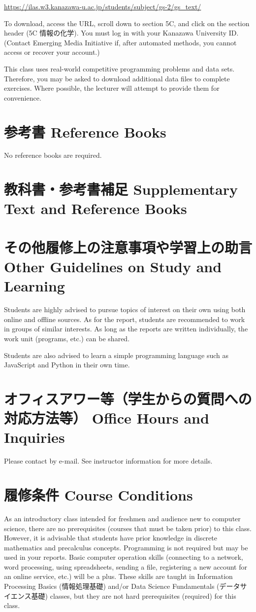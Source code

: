 \documentclass[a4paper]{article}
\begin{document}
\url{https://ilas.w3.kanazawa-u.ac.jp/students/subject/gs-2/gs_text/}

To download, access the URL, scroll down to section 5C, and click on the section header (5C 情報の化学). You must log in with your Kanazawa University ID. (Contact Emerging Media Initiative if, after automated methods, you cannot access or recover your account.)

This class uses real-world competitive programming problems and data sets. Therefore, you may be asked to download additional data files to complete exercises. Where possible, the lecturer will attempt to provide them for convenience.

\section{参考書 Reference Books}
No reference books are required.

\section{教科書・参考書補足 Supplementary Text and Reference Books}

\section{その他履修上の注意事項や学習上の助言 Other Guidelines on Study and Learning}
Students are highly advised to pursue topics of interest on their own using both online and offline sources. As for the report, students are recommended to work in groups of similar interests. As long as the reports are written individually, the work unit (programs, etc.) can be shared.

Students are also advised to learn a simple programming language such as JavaScript and Python in their own time.

\section{オフィスアワー等（学生からの質問への対応方法等） Office Hours and Inquiries}
Please contact by e-mail. See instructor information for more details.

\section{履修条件 Course Conditions}
As an introductory class intended for freshmen and audience new to computer science, there are no prerequisites (courses that must be taken prior) to this class. However, it is advisable that students have prior knowledge in discrete mathematics and precalculus concepts. Programming is not required but may be used in your reports. Basic computer operation skills (connecting to a network, word processing, using spreadsheets, sending a file, registering a new account for an online service, etc.) will be a plus. These skills are taught in Information Processing Basics (情報処理基礎) and/or Data Science Fundamentals (データサイエンス基礎) classes, but they are not hard prerequisites (required) for this class.
\end{document}
